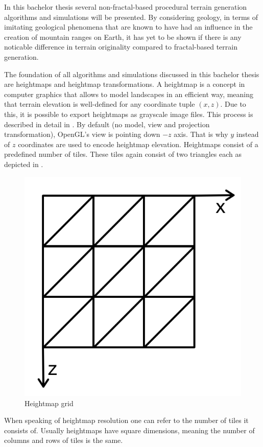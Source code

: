 \documentclass[11pt,a4paper,twoside,openright]{report}
\begin{document}
In this bachelor thesis several non-fractal-based procedural terrain generation algorithms and simulations will be presented. By considering geology, in terms of imitating geological phenomena that are known to have had an influence in the creation of mountain ranges on Earth, it has yet to be shown if there is any noticable difference in terrain originality compared to fractal-based terrain generation.

The foundation of all algorithms and simulations discussed in this bachelor thesis are heightmaps and heightmap transformations. A heightmap is a concept in computer graphics that allows to model landscapes in an efficient way, meaning that terrain elevation is well-defined for any coordinate tuple $(x,z)$. Due to this, it is possible to export heightmaps as grayscale image files. This process is described in detail in . By default (no model, view and projection transformation), OpenGL's view is pointing down $-z$ axis. That is why $y$ instead of $z$ coordinates are used to encode heightmap elevation. Heightmaps consist of a predefined number of tiles. These tiles again consist of two triangles each as depicted in .
\begin{figure}[h]
\centering
\includegraphics[width=0.25\linewidth]{heightmapgrid.png}
\caption{Heightmap grid}\label{fig:heightmapgrid}
\end{figure}

\noindent When speaking of heightmap resolution one can refer to the number of tiles it consists of. Usually heightmaps have square dimensions, meaning the number of columns and rows of tiles is the same.
\end{document}
